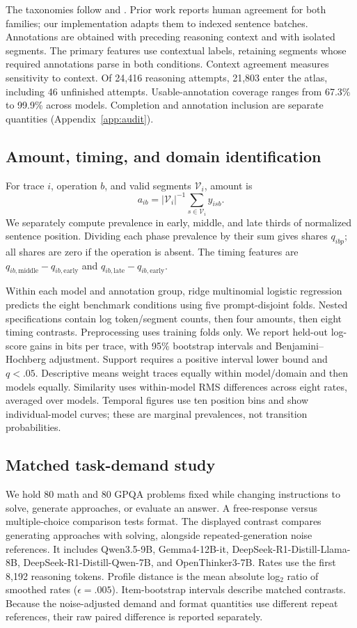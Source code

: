 The taxonomies follow \citet{kim2026society} and \citet{gandhi2025habits}. Prior work reports human agreement for both families; our implementation adapts them to indexed sentence batches. Annotations are obtained with preceding reasoning context and with isolated segments. The primary features use contextual labels, retaining segments whose required annotations parse in both conditions. Context agreement measures sensitivity to context. Of 24,416 reasoning attempts, 21,803 enter the atlas, including 46 unfinished attempts. Usable-annotation coverage ranges from 67.3\% to 99.9\% across models. Completion and annotation inclusion are separate quantities (Appendix~\ref{app:audit}).

\subsection{Amount, timing, and domain identification}
For trace $i$, operation $b$, and valid segments $\mathcal V_i$, amount is
\begin{equation}
a_{ib}=|\mathcal V_i|^{-1}\sum_{s\in\mathcal V_i} y_{isb}.
\end{equation}
We separately compute prevalence in early, middle, and late thirds of normalized sentence position. Dividing each phase prevalence by their sum gives shares $q_{ibp}$; all shares are zero if the operation is absent. The timing features are $q_{ib,\mathrm{middle}}-q_{ib,\mathrm{early}}$ and $q_{ib,\mathrm{late}}-q_{ib,\mathrm{early}}$.

Within each model and annotation group, ridge multinomial logistic regression predicts the eight benchmark conditions using five prompt-disjoint folds. Nested specifications contain log token/segment counts, then four amounts, then eight timing contrasts. Preprocessing uses training folds only. We report held-out log-score gains in bits per trace, with 95\% bootstrap intervals and Benjamini--Hochberg adjustment. Support requires a positive interval lower bound and $q<.05$. Descriptive means weight traces equally within model/domain and then models equally. Similarity uses within-model RMS differences across eight rates, averaged over models. Temporal figures use ten position bins and show individual-model curves; these are marginal prevalences, not transition probabilities.

\subsection{Matched task-demand study}
We hold 80 math and 80 GPQA problems fixed while changing instructions to solve, generate approaches, or evaluate an answer. A free-response versus multiple-choice comparison tests format. The displayed contrast compares generating approaches with solving, alongside repeated-generation noise references. It includes Qwen3.5-9B, Gemma4-12B-it, DeepSeek-R1-Distill-Llama-8B, DeepSeek-R1-Distill-Qwen-7B, and OpenThinker3-7B. Rates use the first 8,192 reasoning tokens. Profile distance is the mean absolute log$_2$ ratio of smoothed rates ($\epsilon=.005$). Item-bootstrap intervals describe matched contrasts. Because the noise-adjusted demand and format quantities use different repeat references, their raw paired difference is reported separately.
